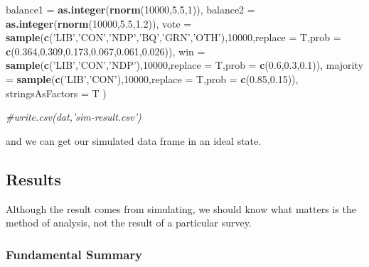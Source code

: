 \documentclass[
]{article}
\newenvironment{Shaded}{\begin{snugshade}}{\end{snugshade}}
\newcommand{\CommentTok}[1]{\textcolor[rgb]{0.56,0.35,0.01}{\textit{#1}}}
\newcommand{\DataTypeTok}[1]{\textcolor[rgb]{0.13,0.29,0.53}{#1}}
\newcommand{\DecValTok}[1]{\textcolor[rgb]{0.00,0.00,0.81}{#1}}
\newcommand{\FloatTok}[1]{\textcolor[rgb]{0.00,0.00,0.81}{#1}}
\newcommand{\KeywordTok}[1]{\textcolor[rgb]{0.13,0.29,0.53}{\textbf{#1}}}
\newcommand{\NormalTok}[1]{#1}
\newcommand{\StringTok}[1]{\textcolor[rgb]{0.31,0.60,0.02}{#1}}
\begin{document}
\begin{Shaded}
\begin{Highlighting}[]
  \DataTypeTok{balance1 =} \KeywordTok{as.integer}\NormalTok{(}\KeywordTok{rnorm}\NormalTok{(}\DecValTok{10000}\NormalTok{,}\FloatTok{5.5}\NormalTok{,}\DecValTok{1}\NormalTok{)),}
  \DataTypeTok{balance2 =} \KeywordTok{as.integer}\NormalTok{(}\KeywordTok{rnorm}\NormalTok{(}\DecValTok{10000}\NormalTok{,}\FloatTok{5.5}\NormalTok{,}\FloatTok{1.2}\NormalTok{)),}
  \DataTypeTok{vote =} \KeywordTok{sample}\NormalTok{(}\KeywordTok{c}\NormalTok{(}\StringTok{'LIB'}\NormalTok{,}\StringTok{'CON'}\NormalTok{,}\StringTok{'NDP'}\NormalTok{,}\StringTok{'BQ'}\NormalTok{,}\StringTok{'GRN'}\NormalTok{,}\StringTok{'OTH'}\NormalTok{),}\DecValTok{10000}\NormalTok{,}\DataTypeTok{replace =}\NormalTok{ T,}\DataTypeTok{prob =} \KeywordTok{c}\NormalTok{(}\FloatTok{0.364}\NormalTok{,}\FloatTok{0.309}\NormalTok{,}\FloatTok{0.173}\NormalTok{,}\FloatTok{0.067}\NormalTok{,}\FloatTok{0.061}\NormalTok{,}\FloatTok{0.026}\NormalTok{)),}
  \DataTypeTok{win =} \KeywordTok{sample}\NormalTok{(}\KeywordTok{c}\NormalTok{(}\StringTok{'LIB'}\NormalTok{,}\StringTok{'CON'}\NormalTok{,}\StringTok{'NDP'}\NormalTok{),}\DecValTok{10000}\NormalTok{,}\DataTypeTok{replace =}\NormalTok{ T,}\DataTypeTok{prob =} \KeywordTok{c}\NormalTok{(}\FloatTok{0.6}\NormalTok{,}\FloatTok{0.3}\NormalTok{,}\FloatTok{0.1}\NormalTok{)),}
  \DataTypeTok{majority =} \KeywordTok{sample}\NormalTok{(}\KeywordTok{c}\NormalTok{(}\StringTok{'LIB'}\NormalTok{,}\StringTok{'CON'}\NormalTok{),}\DecValTok{10000}\NormalTok{,}\DataTypeTok{replace =}\NormalTok{ T,}\DataTypeTok{prob =} \KeywordTok{c}\NormalTok{(}\FloatTok{0.85}\NormalTok{,}\FloatTok{0.15}\NormalTok{)),}
  \DataTypeTok{stringsAsFactors =}\NormalTok{ T}
\NormalTok{)}

\CommentTok{#write.csv(dat,'sim-result.csv')}
\end{Highlighting}
\end{Shaded}

and we can get our simulated data frame in an ideal state.

\hypertarget{results}{%
\subsection{Results}\label{results}}

Although the result comes from simulating, we should know what matters
is the method of analysis, not the result of a particular survey.

\hypertarget{fundamental-summary}{%
\subsubsection{Fundamental Summary}\label{fundamental-summary}}
\end{document}
